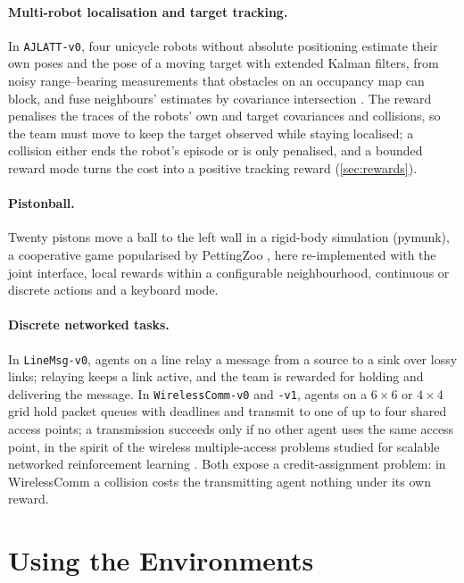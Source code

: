 \documentclass{article}
\newcommand{\envid}[1]{\texttt{#1}}
\begin{document}
\paragraph{Multi-robot localisation and target tracking.} In
\envid{AJLATT-v0}, four unicycle robots without absolute positioning estimate their own poses
and the pose of a moving target with extended Kalman filters, from noisy
range--bearing measurements that obstacles on an occupancy map can block, and
fuse neighbours' estimates by covariance intersection
\citep{julier1997ci}. The reward penalises the traces of the robots' own and
target covariances and collisions, so the team must move to keep the target
observed while staying localised; a collision either ends the robot's episode
or is only penalised, and a bounded reward mode turns the cost into a
positive tracking reward (\cref{sec:rewards}).

\paragraph{Pistonball.} Twenty pistons move a ball to
the left wall in a rigid-body simulation (pymunk), a cooperative game
popularised by PettingZoo \citep{terry2021pettingzoo}, here re-implemented with
the joint interface, local rewards within a configurable neighbourhood,
continuous or discrete actions and a keyboard mode.

\paragraph{Discrete networked tasks.} In \envid{LineMsg-v0}, agents on a line
relay a message from a source to a sink over lossy links; relaying keeps a
link active, and the team is rewarded for holding and delivering the message.
In \envid{WirelessComm-v0} and \envid{-v1}, agents on a $6\times6$ or
$4\times4$ grid hold packet queues with deadlines and transmit to one of up to
four shared access points; a transmission succeeds only if no other agent
uses the same access point, in the spirit of the wireless multiple-access
problems studied for scalable networked reinforcement learning
\citep{qu2020scalable}. Both expose a credit-assignment problem: in
WirelessComm a collision costs the transmitting agent nothing under its own
reward.

\section{Using the Environments}\label{sec:usage}
\end{document}
